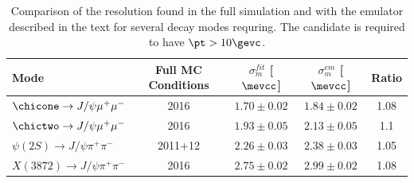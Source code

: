 \begin{table}[htb!]
\caption{\small Comparison of the resolution found in the full
  simulation and with the emulator described in the text for several
  decay modes requring. The candidate is required to have $\pt > 10 \gevc$. }
\begin{center}
\small
\begin{tabular}{l|c|c|c|c}
Mode & Full MC Conditions & $\sigma^{fit}_m$ [$\mevcc$] &
                                                          $\sigma^{em}_m$
                                                          [$\mevcc$] &
  Ratio\\ \hline
$\chicone \rightarrow J/\psi \mu^+ \mu^-$  & 2016 & $1.70 \pm 0.02$ &
                                                                      $1.84
                                                                      \pm
                                                                      0.02$
                                                                     &
  1.08\\
$\chictwo \rightarrow J/\psi \mu^+ \mu^-$  & 2016 & $1.93 \pm 0.05$ &
                                                                      $2.13
                                                                      \pm
                                                                      0.05$
                                                                     &
  1.1\\
$\psi(2S) \rightarrow J/\psi \pi^+ \pi^-$  & 2011+12 & $2.26 \pm 0.03$
                                                        &  $2.38 \pm
                                                          0.03$ & 1.05
  \\
$X(3872) \rightarrow J/\psi \pi^+ \pi^-$  & 2016 &$2.75 \pm 0.02$ &
                                                                    $2.99
                                                                    \pm
                                                                    0.02$
                                                                     &
  1.08\\
\end{tabular}
\end{center}
\label{tab:valid10}
\end{table} 
